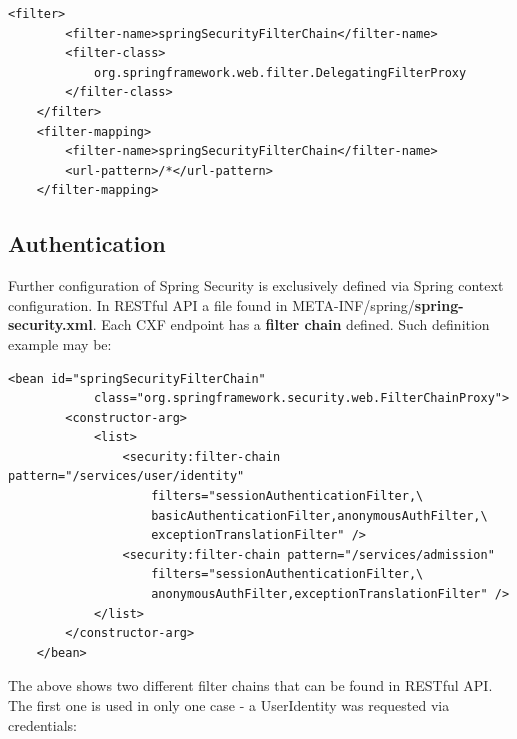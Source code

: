 	\begin{lstlisting}[tabsize=2]
	<filter>
		<filter-name>springSecurityFilterChain</filter-name>
		<filter-class>
			org.springframework.web.filter.DelegatingFilterProxy
		</filter-class>
	</filter>
	<filter-mapping>
		<filter-name>springSecurityFilterChain</filter-name>
		<url-pattern>/*</url-pattern>
	</filter-mapping>
	\end{lstlisting}
	
	\subsection{Authentication}
	
	Further configuration of Spring Security is exclusively defined via Spring context configuration. In RESTful API a file
	found in META-INF/spring/\textbf{spring-security.xml}. Each CXF endpoint has a \textbf{filter chain} defined. Such
	definition example may be:
	
	\begin{lstlisting}[tabsize=2]
	<bean id="springSecurityFilterChain" 
			class="org.springframework.security.web.FilterChainProxy">
		<constructor-arg>
			<list>
				<security:filter-chain pattern="/services/user/identity"
					filters="sessionAuthenticationFilter,\
					basicAuthenticationFilter,anonymousAuthFilter,\
					exceptionTranslationFilter" />
				<security:filter-chain pattern="/services/admission"
					filters="sessionAuthenticationFilter,\
					anonymousAuthFilter,exceptionTranslationFilter" />
			</list>
		</constructor-arg>
	</bean>
	\end{lstlisting}
	
	The above shows two different filter chains that can be found in RESTful API. The first one is used in only one case -
	a UserIdentity was requested via credentials: 
	

